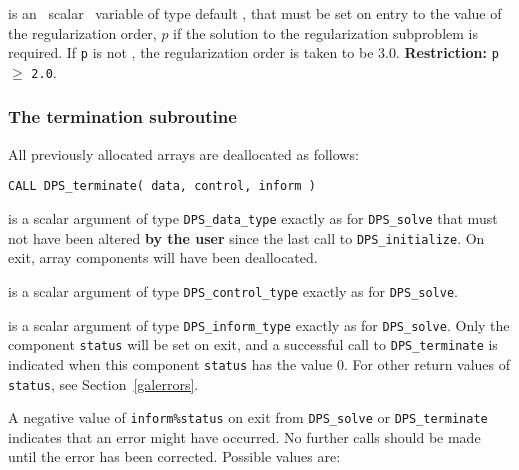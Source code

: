 \documentclass{galahad}
\newcommand{\packagename}{DPS}
\begin{document}
\begin{description}
 is an \optional\ scalar \intentin\ variable of type default
\realdp, that must be set on entry
to the value of the regularization order, $p$
if the solution to the regularization subproblem  is required.
If {\tt p} is not \present, the regularization order is taken to be
$3.0$.
{\bf Restriction: } {\tt p} $\geq$ {\tt 2.0}.


\end{description}


\subsubsection{The  termination subroutine}
All previously allocated arrays are deallocated as follows:

\hskip0.5in
{\tt CALL \packagename\_terminate( data, control, inform )}

\begin{description}

 is a scalar \intentinout argument of type
{\tt \packagename\_data\_type}
exactly as for
{\tt \packagename\_solve}
that must not have been altered {\bf by the user} since the last call to
{\tt \packagename\_initialize}.
On exit, array components will have been deallocated.

 is a scalar \intentin argument of type
{\tt \packagename\_control\_type}
exactly as for
{\tt \packagename\_solve}.

 is a scalar \intentout argument of type
{\tt \packagename\_inform\_type}
exactly as for
{\tt \packagename\_solve}.
Only the component {\tt status} will be set on exit, and a
successful call to
{\tt \packagename\_terminate}
is indicated when this  component {\tt status} has the value 0.
For other return values of {\tt status}, see Section~\ref{galerrors}.

\end{description}


\galerrors
A negative value of  {\tt inform\%status} on exit from
{\tt \packagename\_solve}
or
{\tt \packagename\_terminate}
indicates that an error might have occurred. No further calls should be made
until the error has been corrected. Possible values are:
\end{document}
